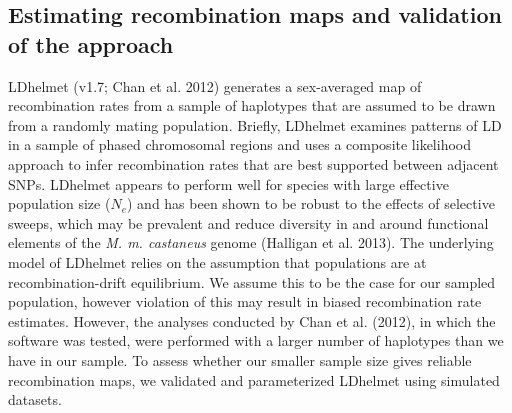 \subsection{Estimating recombination maps and validation of the approach}
 
        	LDhelmet (v1.7; Chan et al. 2012) generates a sex-averaged map of recombination rates from a sample of haplotypes that are assumed to be drawn from a randomly mating population. Briefly, LDhelmet examines patterns of LD in a sample of phased chromosomal regions and uses a composite likelihood approach to infer recombination rates that are best supported between adjacent SNPs. LDhelmet appears to perform well for species with large effective population size ($N_e$) and has been shown to be robust to the effects of selective sweeps, which may be prevalent and reduce diversity in and around functional elements of the \emph{M. m. castaneus} genome (Halligan et al. 2013). The underlying model of LDhelmet relies on the assumption that populations are at recombination-drift equilibrium. We assume this to be the case for our sampled population, however violation of this may result in biased recombination rate estimates. However, the analyses conducted by Chan et al. (2012), in which the software was tested, were performed with a larger number of haplotypes than we have in our sample. To assess whether our smaller sample size gives reliable recombination maps, we validated and parameterized LDhelmet using simulated datasets.
 
